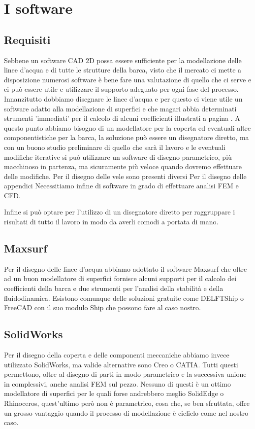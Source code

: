 \chapter{I software}
	\section{Requisiti}
	Sebbene un software CAD 2D possa essere sufficiente per la modellazione delle linee d'acqua e di tutte le strutture della barca, visto che il mercato ci mette a disposizione numerosi software è bene fare una valutazione di quello che ci serve e ci può essere utile e utilizzare il supporto adeguato per ogni fase del processo.
	Innanzitutto dobbiamo disegnare le linee d'acqua e per questo ci viene utile un software adatto alla modellazione di superfici e che magari abbia determinati strumenti 'immediati' per il calcolo di alcuni coefficienti illustrati a pagina  \pageref{chap:coefficienti}.
	A questo punto abbiamo bisogno di un modellatore per la coperta ed eventuali altre componentistiche per la barca, la soluzione può essere un disegnatore diretto, ma con un buono studio preliminare di quello che sarà il lavoro e le eventuali modifiche iterative si può utilizzare un software di disegno parametrico, più macchinoso in partenza, ma sicuramente più veloce quando dovremo effettuare delle modifiche.
	Per il disegno delle vele sono presenti diversi
	Per il disegno delle appendici
	Necessitiamo infine di software in grado di effettuare analisi FEM e CFD.
	
	Infine si può optare per l'utilizzo di un disegnatore diretto per raggruppare i risultati di tutto il lavoro in modo da averli comodi a portata di mano.
	
	\section{Maxsurf}
	Per il disegno delle linee d'acqua abbiamo adottato il software Maxsurf che oltre ad un buon modellatore di superfici fornisce alcuni supporti per il calcolo dei coefficienti della barca e due strumenti per l'analisi della stabilità e della fluidodinamica.
	Esistono comunque delle soluzioni gratuite come DELFTShip o FreeCAD con il suo modulo Ship che possono fare al caso nostro.
	
	\section{SolidWorks}
	Per il disegno della coperta e delle componenti meccaniche abbiamo invece utilizzato SolidWorks, ma valide alternative sono Creo o CATIA. Tutti questi permettono, oltre al disegno di parti in modo parametrico e la successiva unione in complessivi, anche analisi FEM sul pezzo. Nessuno di questi è un ottimo modellatore di superfici per le quali forse andrebbero meglio SolidEdge o Rhinoceros, quest'ultimo però non è parametrico, cosa che, se ben sfruttata, offre un grosso vantaggio quando il processo di modellazione è cicliclo come nel nostro caso.
	
